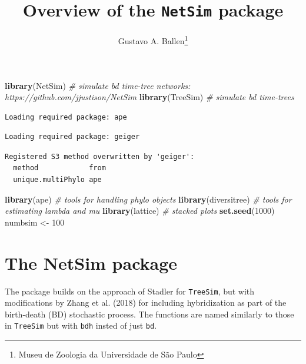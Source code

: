 \documentclass[]{article}
\title{Overview of the \texttt{NetSim} package}
\author{Gustavo A. Ballen\footnote{Museu de Zoologia da Universidade de São
  Paulo}}
\date{}
\newenvironment{Shaded}{\begin{snugshade}}{\end{snugshade}}
\newcommand{\KeywordTok}[1]{\textcolor[rgb]{0.13,0.29,0.53}{\textbf{#1}}}
\newcommand{\DecValTok}[1]{\textcolor[rgb]{0.00,0.00,0.81}{#1}}
\newcommand{\StringTok}[1]{\textcolor[rgb]{0.31,0.60,0.02}{#1}}
\newcommand{\CommentTok}[1]{\textcolor[rgb]{0.56,0.35,0.01}{\textit{#1}}}
\newcommand{\NormalTok}[1]{#1}
\begin{document}
\maketitle

{
\hypersetup{linkcolor=black}
\setcounter{tocdepth}{3}
\tableofcontents
}
\begin{Shaded}
\begin{Highlighting}[]
\KeywordTok{library}\NormalTok{(NetSim)  }\CommentTok{# simulate bd time-tree networks: https://github.com/jjustison/NetSim}
\KeywordTok{library}\NormalTok{(TreeSim)  }\CommentTok{# simulate bd time-trees}
\end{Highlighting}
\end{Shaded}

\begin{verbatim}
Loading required package: ape
\end{verbatim}

\begin{verbatim}
Loading required package: geiger
\end{verbatim}

\begin{verbatim}
Registered S3 method overwritten by 'geiger':
  method            from
  unique.multiPhylo ape 
\end{verbatim}

\begin{Shaded}
\begin{Highlighting}[]
\KeywordTok{library}\NormalTok{(ape)  }\CommentTok{# tools for handling phylo objects}
\KeywordTok{library}\NormalTok{(diversitree)  }\CommentTok{# tools for estimating lambda and mu}
\KeywordTok{library}\NormalTok{(lattice)  }\CommentTok{# stacked plots}
\KeywordTok{set.seed}\NormalTok{(}\DecValTok{1000}\NormalTok{)}
\NormalTok{numbsim <-}\StringTok{ }\DecValTok{100}
\end{Highlighting}
\end{Shaded}

\section{The NetSim package}\label{the-netsim-package}

The package builds on the approach of Stadler for \texttt{TreeSim}, but
with modifications by Zhang et al. (2018) for including hybridization as
part of the birth-death (BD) stochastic process. The functions are named
similarly to those in \texttt{TreeSim} but with \texttt{bdh} insted of
just \texttt{bd}.
\end{document}
